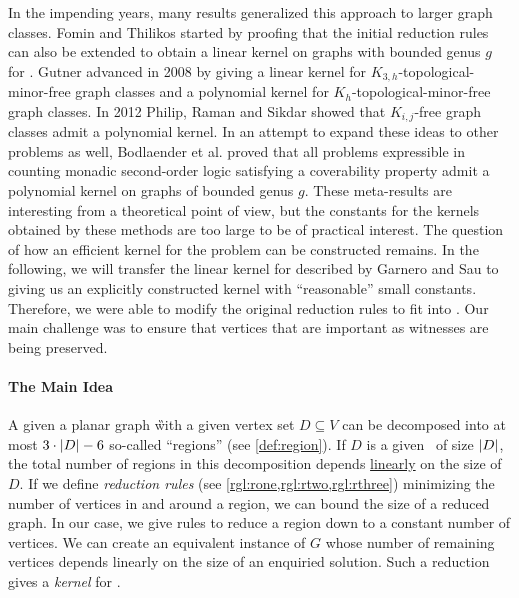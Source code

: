 In the impending years, many results generalized this approach to larger graph classes. Fomin and Thilikos \cite{Fomin2004} started by proofing that the initial reduction rules \cite{Alber2004} can also be extended to obtain a linear kernel on graphs with bounded genus $g$ for \dom.
Gutner \cite{Gutner2009} advanced in 2008 by giving a linear kernel for $K_{3,h}$-topological-minor-free graph classes and a polynomial kernel for $K_h$-topological-minor-free graph classes. 
In 2012 Philip, Raman and Sikdar \cite{Philip2012} showed that $K_{i,j}$-free graph classes admit a polynomial kernel. 
In an attempt to expand these ideas to other problems as well, Bodlaender et al. \cite{Bodlaender2016} proved that all problems expressible in counting monadic second-order logic satisfying a coverability property admit a polynomial kernel on graphs of bounded genus $g$. These meta-results are interesting from a theoretical point of view, but the constants for the kernels obtained by these methods are too large to be of practical interest. 
The question of how an efficient kernel for the \psdom problem can be constructed remains. In the following, we will transfer the linear kernel for \ptdom described by Garnero and Sau \cite[Revision 2014]{Garnero2018} to \psdom giving us an explicitly constructed kernel with ``reasonable'' small constants. Therefore, we were able to modify the original reduction rules to fit into \psdom. Our main challenge was to ensure that vertices that are important as witnesses are being preserved. 

 \paragraph{The Main Idea} A given a planar graph \G with a given vertex set $D \subseteq V$ can be decomposed into at most $3 \cdot \abs{D} -6$ so-called ``regions'' (see \cref{def:region}). If $D$ is a given \sdom~of size $\abs{D}$, the total number of regions in this decomposition depends \underline{linearly} on the size of $D$. If we define \textit{reduction rules} (see \cref{rgl:rone,rgl:rtwo,rgl:rthree})  minimizing the number of vertices in and around a region, we can bound the size of a reduced graph. In our case, we give rules to reduce a region down to a constant number of vertices. We can create an equivalent instance of $G$ whose number of remaining vertices depends linearly on the size of an enquiried solution. Such a reduction gives a \textit{kernel} for \psdom.


